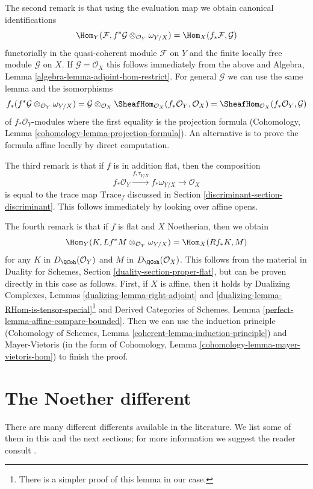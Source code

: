 \medskip\noindent
The second remark is that using the evaluation map we obtain
canonical identifications
$$
\Hom_Y(\mathcal{F}, f^*\mathcal{G} \otimes_{\mathcal{O}_Y} \omega_{Y/X})
=
\Hom_X(f_*\mathcal{F}, \mathcal{G})
$$
functorially in the quasi-coherent module $\mathcal{F}$ on $Y$
and the finite locally free module $\mathcal{G}$ on $X$.
If $\mathcal{G} = \mathcal{O}_X$ this follows immediately
from the above and
Algebra, Lemma \ref{algebra-lemma-adjoint-hom-restrict}.
For general $\mathcal{G}$ we can use the same lemma and the
isomorphisms
$$
f_*(f^*\mathcal{G} \otimes_{\mathcal{O}_Y} \omega_{Y/X}) =
\mathcal{G} \otimes_{\mathcal{O}_X}
\SheafHom_{\mathcal{O}_X}(f_*\mathcal{O}_Y, \mathcal{O}_X) =
\SheafHom_{\mathcal{O}_X}(f_*\mathcal{O}_Y, \mathcal{G})
$$
of $f_*\mathcal{O}_Y$-modules where the first equality is the
projection formula
(Cohomology, Lemma \ref{cohomology-lemma-projection-formula}).
An alternative is to prove the formula affine locally by
direct computation.

\medskip\noindent
The third remark is that if $f$ is in addition flat, then the
composition
$$
f_*\mathcal{O}_Y \xrightarrow{f_*\tau_{Y/X}} f_*\omega_{Y/X}
\longrightarrow \mathcal{O}_X
$$
is equal to the trace map $\text{Trace}_f$ discussed in
Section \ref{discriminant-section-discriminant}. This follows immediately by
looking over affine opens.

\medskip\noindent
The fourth remark is that if $f$ is flat and $X$ Noetherian, then
we obtain
$$
\Hom_Y(K, Lf^*M \otimes_{\mathcal{O}_Y} \omega_{Y/X})
=
\Hom_X(Rf_*K, M)
$$
for any $K$ in $D_\QCoh(\mathcal{O}_Y)$ and $M$ in $D_\QCoh(\mathcal{O}_X)$.
This follows from the material in
Duality for Schemes, Section \ref{duality-section-proper-flat},
but can be proven directly in this case as follows.
First, if $X$ is affine, then it holds by
Dualizing Complexes, Lemmas \ref{dualizing-lemma-right-adjoint} and
\ref{dualizing-lemma-RHom-is-tensor-special}\footnote{There is a
simpler proof of this lemma in our case.} and
Derived Categories of Schemes, Lemma \ref{perfect-lemma-affine-compare-bounded}.
Then we can use the induction principle
(Cohomology of Schemes, Lemma \ref{coherent-lemma-induction-principle})
and Mayer-Vietoris
(in the form of Cohomology, Lemma \ref{cohomology-lemma-mayer-vietoris-hom})
to finish the proof.

\section{The Noether different}
\label{discriminant-section-noether-different}
There are many different differents available in the literature.
We list some of them in this and the next sections; for more
information we suggest the reader consult \cite{Kunz}.

